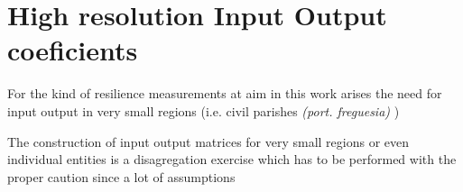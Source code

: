 
\section{High resolution Input Output coeficients}


For the kind of resilience measurements at aim in this work arises the need for
input output in very small regions (i.e. civil parishes \textit{(port. freguesia)} ) 

The construction of input output matrices for very small regions or even
individual entities is a disagregation exercise which has to be performed with
the proper caution since a lot of assumptions 

